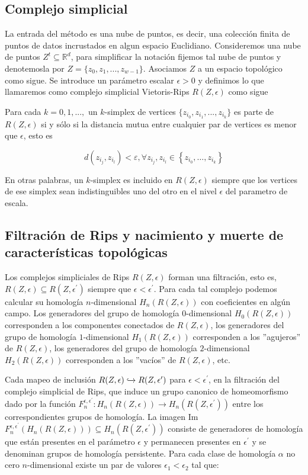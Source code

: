 \subsection{Complejo simplicial}
\label{funda_mental_complejoSim}

La entrada del método es una nube de puntos, es decir, una colección finita de puntos de datos incrustados en algun espacio Euclidiano. Consideremos una nube de puntos ${Z^t} \subseteq  \mathbb{R}^{d}$, para simplificar la notación fijemos tal nube de puntos y denotemosla por $Z=\{z_0,z_1,...,z_{w-1}\}$. Asociamos $Z$ a un espacio topológico como sigue. Se introduce un parámetro escalar $\epsilon > 0$ y definimos lo que llamaremos como complejo simplicial Vietoris-Rips $R(Z,\epsilon)$ como sigue

Para cada $k=0,1,...,$ un $k$-simplex de vertices $\{ z_{i_0},z_{i_1},...,z_{i_k} \}$ es parte de $R(Z,\epsilon)$ si y sólo si la distancia mutua entre cualquier par de vertices es menor que $\epsilon$, esto es

\[
d\left(z_{i_{j}}, z_{i_{l}}\right)<\varepsilon, \forall z_{i_{j}}, z_{i_{l}} \in\left\{z_{i_{0}}, \ldots, z_{i_{k}}\right\}
\]

En otras palabras, un $k$-simplex es incluido en $R(Z,\epsilon)$ siempre que los vertices de ese simplex sean indistinguibles uno del otro en el nivel $\epsilon$ del parametro de escala.

\subsection{Filtración de Rips y nacimiento y muerte de características topológicas}

Los complejos simpliciales de Rips $R(Z,\epsilon)$ forman una filtración, esto es, $R(Z,\epsilon) \subseteq R(Z,\epsilon^{\prime})$ siempre que $\epsilon < \epsilon^{\prime} $. Para cada tal complejo podemos calcular su homología $n$-dimensional $H_n(R(Z,\epsilon))$ con coeficientes en algún campo. Los generadores del grupo de homología $0$-dimensional $H_0(R(Z,\epsilon))$ corresponden a los componentes conectados de $R(Z,\epsilon)$, los generadores del grupo de homología $1$-dimensional $H_1(R(Z,\epsilon))$ corresponden a los ''agujeros'' de $R(Z,\epsilon)$, los generadores del grupo de homología $2$-dimensional $H_2(R(Z,\epsilon))$ corresponden a los ''vacíos'' de $R(Z,\epsilon)$, etc.

Cada mapeo de inclusión $R(Z,\epsilon) \xhookrightarrow{} R(Z,\epsilon^{\prime})$ para $\epsilon < \epsilon^{\prime}$, en la filtración del complejo simplicial de Rips, que induce un grupo canonico de homeomorfismo dado por la función $F_n^{\epsilon,\epsilon^{\prime}}:H_n(R(Z,\epsilon)) \to H_n(R(Z,\epsilon^{\prime}))$ entre los correspondientes grupos de homología. La imagen Im$F_n^{\epsilon,\epsilon^{\prime}}(H_n(R(Z,\epsilon))) \subseteq  H_n(R(Z,\epsilon^{\prime})) $ consiste de generadores de homología que están presentes en el parámetro $\epsilon$ y permanecen presentes en $\epsilon^{\prime}$ y se denominan grupos de homología persistente. Para cada clase de homología $\alpha$ no cero $n$-dimensional existe un par de valores $\epsilon_1 < \epsilon_2$ tal que:

